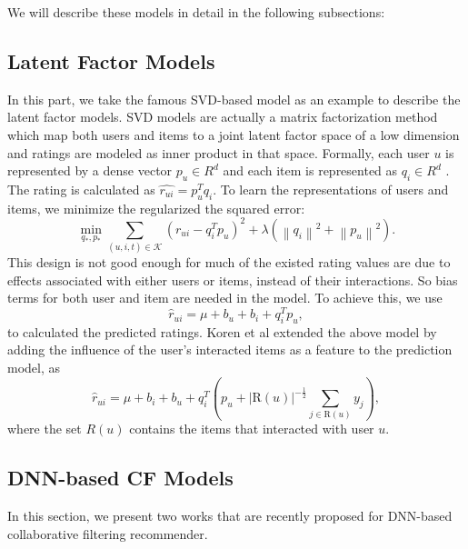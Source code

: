We will describe these models in detail in the following subsections:
\subsection{Latent Factor Models}
In this part, we take the famous SVD-based model as an example to describe
the latent factor models.
SVD models are actually a matrix factorization method which map both users 
and items to a joint latent factor space of a low dimension and ratings are
modeled as inner product in that space. Formally, each user $u$ is represented
by a dense vector $p_u \in R^d$ and each item is represented as $q_i \in R^d$
. The rating is calculated as $\hat{r_{ui}} = p_u^T q_i$. To learn the representations
of users and items, we minimize the regularized the squared error:
\begin{equation}
    \min _{q_{*}, p_{*}} \sum_{(u, i, t) \in \mathcal{K}}\left(r_{u i}-q_{i}^{T} p_{u}\right)^{2}+\lambda\left(\left\|q_{i}\right\|^{2}+\left\|p_{u}\right\|^{2}\right).
\end{equation}
This design is not good enough for much of the existed rating values 
are due to effects associated with either users or items, instead of 
their interactions. So bias terms for both user and item are needed in the model.
To achieve this, we use 
\begin{equation}
        \hat{r}_{u i}=\mu+b_{u}+b_{i}+q_{i}^{T} p_{u},
\end{equation}
to calculated the predicted ratings.
Koren et al\cite{koren2008factorization} extended the above model by adding the influence
of the user's interacted items as a feature to the prediction model, as
\begin{equation}
    \hat{r}_{u i}=\mu+b_{i}+b_{u}+q_{i}^{T}\left(p_{u}+|\mathrm{R}(u)|^{-\frac{1}{2}} \sum_{j \in \mathrm{R}(u)} y_{j}\right),
\end{equation}
where the set $R(u)$ contains the items that interacted with user $u$.


\subsection{DNN-based CF Models}
In this section, we present two works that are recently proposed for DNN-based
collaborative filtering recommender.


